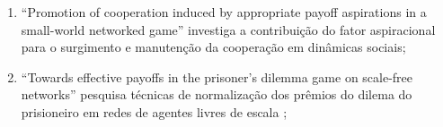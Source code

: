 \begin{enumerate}
\item ``Promotion of cooperation induced by appropriate payoff aspirations in a small-world networked game'' investiga a contribuição do fator aspiracional para o surgimento e manutenção da cooperação em dinâmicas sociais;%
\item ``Towards effective payoffs in the prisoner’s dilemma game on scale-free networks'' pesquisa técnicas de normalização dos prêmios do dilema do prisioneiro em redes de agentes livres de escala ;%
\end{enumerate}
